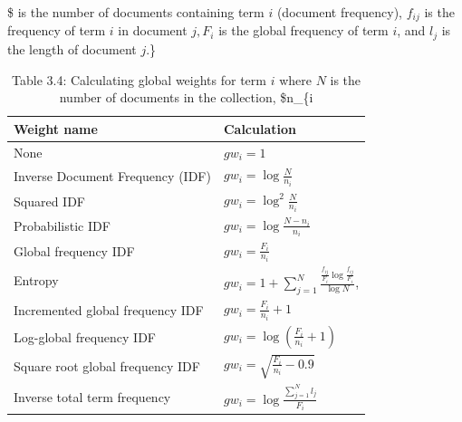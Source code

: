 \documentclass[10pt]{book}
\begin{document}
\begin{table}[h]
\begin{center}
\captionsetup{labelformat=empty}
\caption{Table 3.4: Calculating global weights for term $i$ where $N$ is the number of documents in the collection, \$n\_\{i}\$ is the number of documents containing term $i$ (document frequency), $f_{i j}$ is the frequency of term $i$ in document $j, F_{i}$ is the global frequency of term $i$, and $l_{j}$ is the length of document $j$.\}\\
\begin{tabular}{|l|l|}
\hline
Weight name & Calculation \\
\hline
None & $g w_{i}=1$ \\
\hline
Inverse Document Frequency (IDF) & $g w_{i}=\log \frac{N}{n_{i}}$ \\
\hline
Squared IDF & $g w_{i}=\log ^{2} \frac{N}{n_{i}}$ \\
\hline
Probabilistic IDF & $g w_{i}=\log \frac{N-n_{i}}{n_{i}}$ \\
\hline
Global frequency IDF & $g w_{i}=\frac{F_{i}}{n_{i}}$ \\
\hline
Entropy & $g w_{i}=1+\sum_{j=1}^{N} \frac{\frac{f_{i j}}{F_{i}} \log \frac{f_{i j}}{F_{i}}}{\log N}$, \\
\hline
Incremented global frequency IDF & $g w_{i}=\frac{F_{i}}{n_{i}}+1$ \\
\hline
Log-global frequency IDF & $g w_{i}=\log \left(\frac{F_{i}}{n_{i}}+1\right)$ \\
\hline
Square root global frequency IDF & $g w_{i}=\sqrt{\frac{F_{i}}{n_{i}}-0.9}$ \\
\hline
Inverse total term frequency & $g w_{i}=\log \frac{\sum_{j=1}^{N} l_{j}}{F_{i}}$ \\
\hline
\end{tabular}
\end{center}
\end{table}
\end{document}
